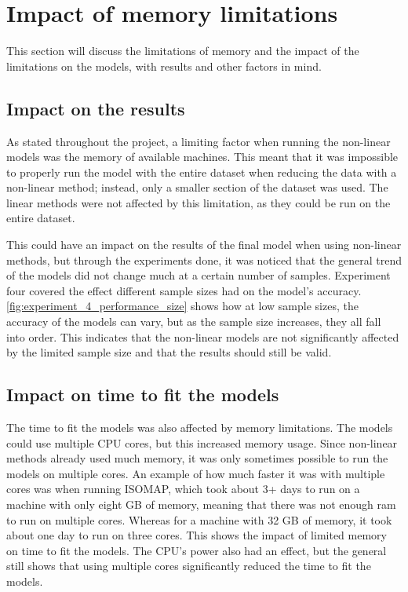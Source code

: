 \section{Impact of memory limitations}\label{sec:impact_of_memory_limitations}
This section will discuss the limitations of memory and the impact of the limitations on the models, with results and other factors in mind.


\subsection{Impact on the results}\label{subsec:impact_on_results}
As stated throughout the project, a limiting factor when running the non-linear models was the memory of available machines. This meant that it was impossible to properly run the model with the entire dataset when reducing the data with a non-linear method; instead, only a smaller section of the dataset was used. The linear methods were not affected by this limitation, as they could be run on the entire dataset.

This could have an impact on the results of the final model when using non-linear methods, but through the experiments done, it was noticed that the general trend of the models did not change much at a certain number of samples. Experiment four covered the effect different sample sizes had on the model's accuracy. \autoref{fig:experiment_4_performance_size} shows how at low sample sizes, the accuracy of the models can vary, but as the sample size increases, they all fall into order. This indicates that the non-linear models are not significantly affected by the limited sample size and that the results should still be valid.


\subsection{Impact on time to fit the models}\label{subsec:impact_on_time_to_fit_the_models}
The time to fit the models was also affected by memory limitations. The models could use multiple CPU cores, but this increased memory usage. Since non-linear methods already used much memory, it was only sometimes possible to run the models on multiple cores. An example of how much faster it was with multiple cores was when running ISOMAP, which took about 3+ days to run on a machine with only eight GB of memory, meaning that there was not enough ram to run on multiple cores. Whereas for a machine with 32 GB of memory, it took about one day to run on three cores. This shows the impact of limited memory on time to fit the models. The CPU's power also had an effect, but the general still shows that using multiple cores significantly reduced the time to fit the models.



